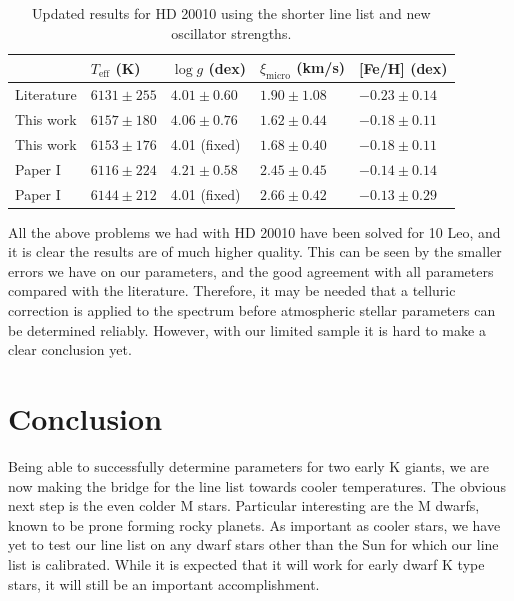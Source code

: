 \documentclass{aa}
\begin{document}
\begin{table}[htb!]
    \caption{Updated results for HD 20010 using the shorter line list and new
             oscillator strengths.}
    \label{tab:hd20010}
    \centering
    \begin{tabular}{lllll}
      \hline\hline
                      & $T_\mathrm{eff}$ (K) &  $\log g$ (dex)  &   $\xi_\mathrm{micro}$ (km/s)   & [Fe/H] (dex)     \\
      \hline
        Literature    & $6131 \pm 255$       &  $4.01 \pm 0.60$ &    $1.90 \pm 1.08$              & $-0.23 \pm 0.14$ \\
      \hline
        This work     & $6157 \pm 180$       &  $4.06 \pm 0.76$ &    $1.62 \pm 0.44$              & $-0.18 \pm 0.11$ \\
        This work     & $6153 \pm 176$       &   4.01 (fixed)   &    $1.68 \pm 0.40$              & $-0.18 \pm 0.11$ \\
      \hline
        Paper I       & $6116 \pm 224$       &  $4.21 \pm 0.58$ &    $2.45 \pm 0.45$              & $-0.14 \pm 0.14$ \\
        Paper I       & $6144 \pm 212$       &   4.01 (fixed)   &    $2.66 \pm 0.42$              & $-0.13 \pm 0.29$ \\
      \hline
    \end{tabular}
\end{table}

All the above problems we had with HD 20010 have been solved for 10 Leo, and it
is clear the results are of much higher quality. This can be seen by the smaller
errors we have on our parameters, and the good agreement with all parameters
compared with the literature. Therefore, it may be needed that a telluric
correction is applied to the spectrum before atmospheric stellar parameters can
be determined reliably. However, with our limited sample it is hard to make a
clear conclusion yet.





\section{Conclusion}
\label{sec:conclusion}

Being able to successfully determine parameters for two early K giants, we are
now making the bridge for the line list towards cooler temperatures. The obvious
next step is the even colder M stars. Particular interesting are the M dwarfs,
known to be prone forming rocky planets. As important as cooler stars, we have
yet to test our line list on any dwarf stars other than the Sun for which our
line list is calibrated. While it is expected that it will work for early dwarf
K type stars, it will still be an important accomplishment.
\end{document}
